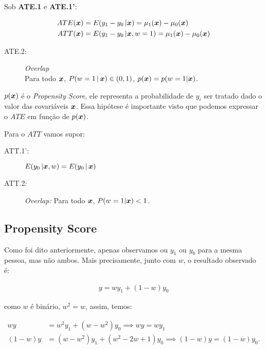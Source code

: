 \documentclass[11pt,oneside,a4paper]{article}
\numberwithin{equation}{section}
\begin{document}
\begin{description}
\begin{description}
Sob \textbf{ATE.1} e \textbf{ATE.1'}:

\vspace{-1 em}
\begin{align*}
	ATE( \boldsymbol{x} ) &= E( y_{1} - y_{0} \, | \boldsymbol{x} ) = \mu_{1}(\boldsymbol{x}) - \mu_{0}(\boldsymbol{x}) 
	\\
	ATT( \boldsymbol{x} ) &= E( y_{1} - y_{0} \, | \boldsymbol{x}, w=1 ) = \mu_{1}(\boldsymbol{x}) - \mu_{0}(\boldsymbol{x}) 
\end{align*}

\begin{description}
\item[ATE.2:] \textit{Overlap} \\
Para todo $\boldsymbol{x}$, $P(w=1 \, | \, \boldsymbol{x} ) \in ( 0, 1 )$, 
$p(\boldsymbol{x}) = p(w=1 | \boldsymbol{x})$.
\end{description}

$p(\boldsymbol{x})$ é o \textit{Propensity Score}, ele representa a probabilidade de $y_{i}$ ser tratado dado o valor das covariáveis $\boldsymbol{x}$.
Essa hipótese é importante visto que podemos expressar o $ATE$ em função de $p(\boldsymbol{x})$.

\vspace{1 em}
Para o $ATT$ vamos supor:

\begin{description}
\item[ATT.1':] 
	$E( y_{0} \, | \boldsymbol{x}, w ) = E( y_{0} \, | \, \boldsymbol{x} )$

\item[ATT.2:] \textit{Overlap:} Para todo $\boldsymbol{x}$, $P(w=1 | \boldsymbol{x} ) < 1$.
\end{description}

\subsection*{Propensity Score}

Como foi dito anteriormente, apenas observamos ou $y_{1}$ ou $y_{0}$ para a mesma pessoa, mas não ambos.
Mais precisamente, junto com $w$, o resultado observado é:

\vspace{-1 em}
\begin{align*}
	y = wy_{1} + (1 - w) y_{0}
\end{align*}

\noindent
como  $w$ é binário, $w^2 = w$, assim, temos:

\vspace{-1 em}
\begin{align*}
w y &= w^{2} y_{1} + (w - w^{2}) y_{0}
\implies
\boxed{w y = w y_{1} }
\\
( 1 - w ) y &= (w - w^{2}) y_{1} + ( w^{2} - 2w + 1 ) y_{0}
\implies
\boxed{( 1 - w ) y = (1 - w) y_{0}}.
\end{align*}


\end{description}
\end{description}
\end{document}
